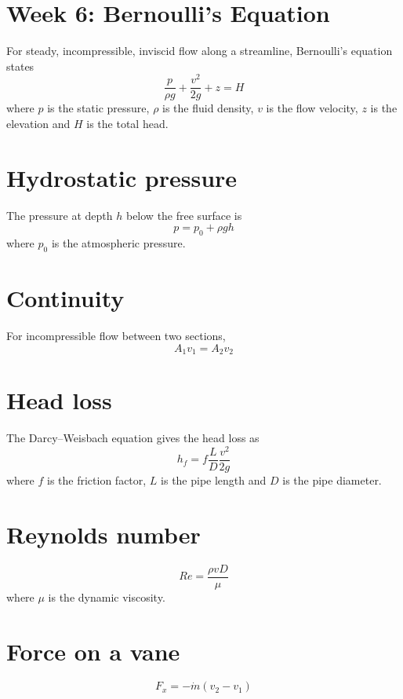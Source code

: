 \documentclass[11pt]{article}
\begin{document}
\section*{Week 6: Bernoulli's Equation}
For steady, incompressible, inviscid flow along a streamline, Bernoulli's equation states
\[ \frac{p}{\rho g} + \frac{v^2}{2g} + z = H \]
where $p$ is the static pressure, $\rho$ is the fluid density, $v$ is the flow velocity, $z$ is the elevation and $H$ is the total head.

\section*{Hydrostatic pressure}
The pressure at depth $h$ below the free surface is
\[ p = p_0 + \rho g h \]
where $p_0$ is the atmospheric pressure.

\section*{Continuity}
For incompressible flow between two sections,
\[ A_1 v_1 = A_2 v_2 \]

\section*{Head loss}
The Darcy--Weisbach equation gives the head loss as
\[ h_f = f \frac{L}{D} \frac{v^2}{2g} \]
where $f$ is the friction factor, $L$ is the pipe length and $D$ is the pipe diameter.

\section*{Reynolds number}
\[ Re = \frac{\rho v D}{\mu} \]
where $\mu$ is the dynamic viscosity.

\section*{Force on a vane}
\[ F_x = -\dot{m}(v_2 - v_1) \]
\end{document}
